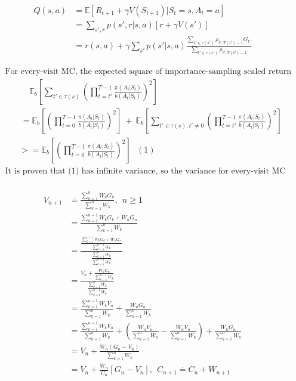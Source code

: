 \documentclass{article}
\begin{document}

\[
  \begin{aligned}
    Q(s, a) &= \mathbb{E}[R_{t+1} + \gamma V(S_{t+1}) | S_t=s, A_t=a]\\
    &=\sum_{s',r} p(s',r|s,a) [r + \gamma V(s')]\\
    &=r(s,a) + \gamma \sum_{s'} p(s'|s,a) \frac {\sum_{t'\in\tau(s')}\rho_{t':T(t')-1}G_{t'}}
                                                {\sum_{t'\in\tau(s')}\rho_{t':T(t')-1}}
  \end{aligned}
\]

\[
  \begin{aligned}
    &\text{ For every-visit MC, the expected square of importance-sampling scaled return for a state s is: } \\
    &\qquad \quad\ \mathbb{E}_b[\sum_{t'\in\tau(s)}(\prod_{t=t'}^{T-1} \frac {\pi(A_t|S_t)} {b(A_t|S_t)})^2]\\
    &\qquad \ = \mathbb{E}_b[(\prod_{t=0}^{T-1} \frac {\pi(A_t|S_t)} {b(A_t|S_t)})^2] \ + \
                \mathbb{E}_b[\sum_{t'\in\tau(s), t'\not=0}(\prod_{t=t'}^{T-1} \frac {\pi(A_t|S_t)} {b(A_t|S_t)})^2]\\
    &\qquad >=  \mathbb{E}_b[(\prod_{t=0}^{T-1} \frac {\pi(A_t|S_t)} {b(A_t|S_t)})^2] \ \ \ (1) \\
    &\text{ It is proven that (1) has infinite variance, so the variance for every-visit MC estimator is still infinite.} \\
  \end{aligned}
\]

\[
  \begin{aligned}
    V_{n+1} &\overset {.} {=} \frac {\sum_{k=1}^{n} W_k G_k} {\sum_{k=1}^{n} W_k}, \ \ n \geq 1 \\
    &= \frac {\sum_{k=1}^{n-1} W_k G_k + W_nG_n} {\sum_{k=1}^{n} W_k} \\
    &= \frac {\frac {\sum_{k=1}^{n-1} W_k G_k + W_nG_n} {\sum_{k=1}^{n-1} W_k}}
             {\frac {\sum_{k=1}^{n} W_k} {\sum_{k=1}^{n-1} W_k}}\\
    &= \frac {V_n + \frac {W_nG_n} {\sum_{k=1}^{n-1} W_k}}
             {\frac {\sum_{k=1}^{n} W_k} {\sum_{k=1}^{n-1} W_k}}\\
   &= \frac {\sum_{k=1}^{n-1} W_k V_n} {\sum_{k=1}^{n} W_k} + \frac {W_nG_n} {\sum_{k=1}^{n} W_k} \\
   &= \frac {\sum_{k=1}^{n-1} W_k V_n} {\sum_{k=1}^{n} W_k} +
      (\frac {W_n V_n} {\sum_{k=1}^{n} W_k} - \frac {W_n V_n} {\sum_{k=1}^{n} W_k}) +
      \frac {W_nG_n} {\sum_{k=1}^{n} W_k} \\
   &= V_n + \frac {W_n(G_n - V_n)} {\sum_{k=1}^{n} W_k} \\
   &= V_n + \frac {W_n} {C_n}[G_n - V_n], \ \ C_{n+1} \overset {.} {=} C_n + W_{n+1}
  \end{aligned}
\]
\end{document}
